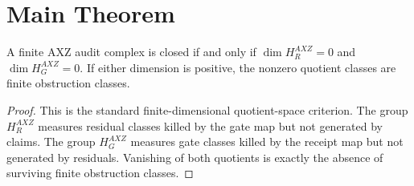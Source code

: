 \section{Main Theorem}
\begin{theorem}
A finite AXZ audit complex is closed if and only if $\dim H_R^{AXZ}=0$ and $\dim H_G^{AXZ}=0$. If either dimension is positive, the nonzero quotient classes are finite obstruction classes.
\end{theorem}
\begin{proof}
This is the standard finite-dimensional quotient-space criterion. The group $H_R^{AXZ}$ measures residual classes killed by the gate map but not generated by claims. The group $H_G^{AXZ}$ measures gate classes killed by the receipt map but not generated by residuals. Vanishing of both quotients is exactly the absence of surviving finite obstruction classes.
\end{proof}

